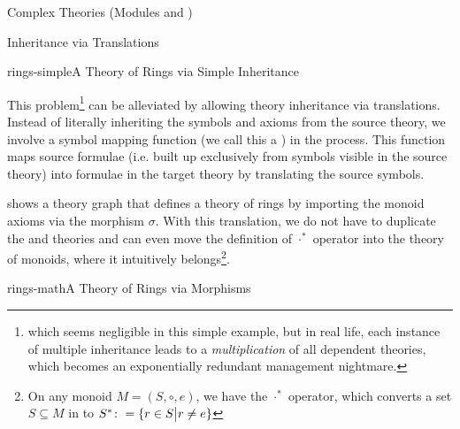 \begin{tchapter}[id=complex-theories,short=Complex Theories]{Complex Theories (Modules
    {} and {})}
\begin{tsection}[id=morphisms]{Inheritance via Translations}
\begin{myfig}{rings-simple}{A Theory of Rings via Simple Inheritance}
{}
\end{myfig}
  
This problem\footnote{which seems negligible in this simple example, but in real life,
  each instance of multiple inheritance leads to a {\emph{multiplication}} of all
  dependent theories, which becomes an exponentially redundant management nightmare.} can
be alleviated by allowing theory inheritance via translations.  Instead of literally
inheriting the symbols and axioms from the source theory, we involve a symbol mapping
function (we call this a {}) in the process. This function maps source
formulae (i.e. built up exclusively from symbols visible in the source theory) into
formulae in the target theory by translating the source symbols.
  
{} shows a theory graph that defines a theory of rings by importing
the monoid axioms via the morphism $\sigma$. With this translation, we do not have to
duplicate the {} and {} theories and can even move the
definition of $\cdot^*$ operator into the theory of monoids, where it intuitively
belongs\footnote{On any monoid $M=(S,\circ,e)$, we have the $\cdot^*$ operator, which
  converts a set $S\subseteq M$ in to $S^*\colon=\{r\in S\bigl|r\ne e\}$}.

\begin{myfig}{rings-math}{A Theory of Rings via Morphisms}
\end{myfig}
\end{tsection}
\end{tchapter}
